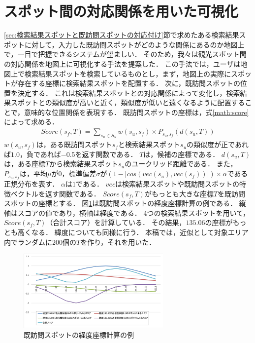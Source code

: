 \documentclass{deimj}
\begin{document}
\section{スポット間の対応関係を用いた可視化}
\label{sec:検索結果スポットと既訪問スポットの対応関係を用いた可視化}
\ref{sec:検索結果スポットと既訪問スポットの対応付け}節で求めたある検索結果スポットに対して，入力した既訪問スポットがどのような関係にあるのか地図上で，一目で把握できるシステムが望ましい．
そのため，我々は観光スポット間の対応関係を地図上に可視化する手法\cite{潘STI}を提案した．
この手法では，ユーザは地図上で検索結果スポットを検索しているものとし，まず，地図上の実際にスポットが存在する座標に検索結果スポットを配置する．
次に，既訪問スポットの位置を決定する．
これは検索結果スポットとの対応関係によって変化し，検索結果スポットとの類似度が高いと近く，類似度が低いと遠くなるように配置することで，意味的な位置関係を表現する．
既訪問スポットの座標は，式\ref{math:score}によって求める．
\begin{eqnarray}
Score(s_f,T) = \sum_{s_u \in S_u}^{} w(s_u,s_f) \times P_{s_u,s_f}(d(s_u,T))
    \label{math:score}
\end{eqnarray}
$w(s_u,s_f)$は，ある既訪問スポット$s_f$と検索結果スポット$s_u$の類似度が正であれば$1.0$，負であれば$-0.5$を返す関数である．
$T$は，候補の座標である．
$d(s_u,T)$は，ある座標$T$から検索結果スポット$s_u$のユークリッド距離である．
また，$P_{s_u,s_f}$は，平均$\mu$が$0$，標準偏差$\sigma$が$(1-|cos(vec(s_u),vec(s_f))|) \times \alpha$である正規分布を表す．
$\alpha$は$1$である．
$vec$は検索結果スポットや既訪問スポットの特徴ベクトルを返す関数である．
$Score(s_f,T)$がもっとも大きな座標$T$を既訪問スポットの座標とする．
図\ref{fig:latlng}は既訪問スポットの経度座標計算の例である．
縦軸はスコアの値であり，横軸は経度である．
4つの検索結果スポットを用いて，$Score(s_f,T)$（合計スコア）を計算している．
その結果，$135.06$の座標がもっとも高くなる．
緯度についても同様に行う．
本稿では，近似として対象エリア内でランダムに200個の$T$を作り，それを用いた．
\begin{figure}[t]
  \begin{center}
    \includegraphics[clip,width=7.5cm]{picture/score_image2.png}
    \caption{既訪問スポットの経度座標計算の例}
    \label{fig:latlng}
  \end{center}
\end{figure}
\end{document}

